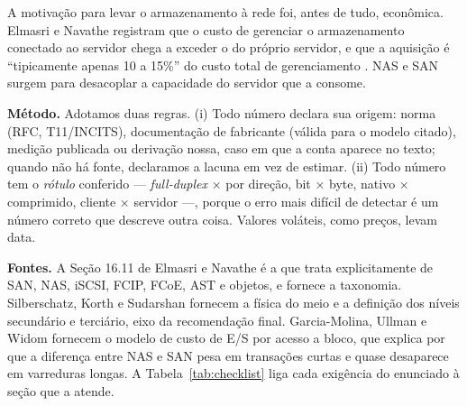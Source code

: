 \documentclass[11pt,a4paper]{article}
\begin{document}
A motivação para levar o armazenamento à rede foi, antes de tudo, econômica. Elmasri e Navathe
registram que o custo de gerenciar o armazenamento conectado ao servidor chega a exceder o do
próprio servidor, e que a aquisição é ``tipicamente apenas 10 a 15\%'' do custo total de
gerenciamento \cite{elmasri2018}. NAS e SAN surgem para desacoplar a capacidade do servidor que a
consome.

\textbf{Método.} Adotamos duas regras. (i) Todo número declara sua origem: norma (RFC, T11/INCITS),
documentação de fabricante (válida para o modelo citado), medição publicada ou derivação nossa, caso
em que a conta aparece no texto; quando não há fonte, declaramos a lacuna em vez de estimar. (ii)
Todo número tem o \emph{rótulo} conferido --- \textit{full-duplex} × por direção, bit × byte, nativo ×
comprimido, cliente × servidor ---, porque o erro mais difícil de detectar é um número correto que
descreve outra coisa. Valores voláteis, como preços, levam data.

\textbf{Fontes.} A Seção 16.11 de Elmasri e Navathe \cite{elmasri2018} é a que trata explicitamente de
SAN, NAS, iSCSI, FCIP, FCoE, AST e objetos, e fornece a taxonomia. Silberschatz, Korth e Sudarshan
\cite{silberschatz2020} fornecem a física do meio e a definição dos níveis secundário e terciário,
eixo da recomendação final. Garcia-Molina, Ullman e Widom \cite{garciamolina2008} fornecem o modelo de
custo de E/S por acesso a bloco, que explica por que a diferença entre NAS e SAN pesa em transações
curtas e quase desaparece em varreduras longas. A Tabela~\ref{tab:checklist} liga cada exigência do
enunciado à seção que a atende.
\end{document}
